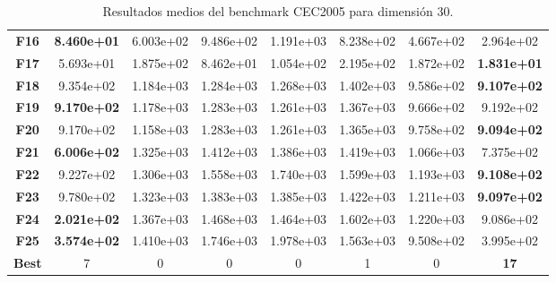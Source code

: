 \begin{table}
{\begin{tabular}{cccccccc}
		\textbf{F16}  &  \textbf{8.460e+01} &  6.003e+02 &  9.486e+02 &  1.191e+03 &  8.238e+02 &  4.667e+02 &  2.964e+02 \\
		\textbf{F17}  &  5.693e+01 &  1.875e+02 &  8.462e+01 &  1.054e+02 &  2.195e+02 &  1.872e+02 &  \textbf{1.831e+01} \\
		\textbf{F18}  &  9.354e+02 &  1.184e+03 &  1.284e+03 &  1.268e+03 &  1.402e+03 &  9.586e+02 &  \textbf{9.107e+02} \\
		\textbf{F19}  &  \textbf{9.170e+02} &  1.178e+03 &  1.283e+03 &  1.261e+03 &  1.367e+03 &  9.666e+02 &  9.192e+02 \\
		\textbf{F20}  &  9.170e+02 &  1.158e+03 &  1.283e+03 &  1.261e+03 &  1.365e+03 &  9.758e+02 &  \textbf{9.094e+02} \\
		\textbf{F21}  &  \textbf{6.006e+02} &  1.325e+03 &  1.412e+03 &  1.386e+03 &  1.419e+03 &  1.066e+03 &  7.375e+02 \\
		\textbf{F22}  &  9.227e+02 &  1.306e+03 &  1.558e+03 &  1.740e+03 &  1.599e+03 &  1.193e+03 &  \textbf{9.108e+02} \\
		\textbf{F23}  &  9.780e+02 &  1.323e+03 &  1.383e+03 &  1.385e+03 &  1.422e+03 &  1.211e+03 &  \textbf{9.097e+02} \\
		\textbf{F24}  &  \textbf{2.021e+02} &  1.367e+03 &  1.468e+03 &  1.464e+03 &  1.602e+03 &  1.220e+03 &  9.086e+02 \\
		\textbf{F25}  &  \textbf{3.574e+02} &  1.410e+03 &  1.746e+03 &  1.978e+03 &  1.563e+03 &  9.508e+02 &  3.995e+02 \\
		\textbf{Best} &          7 &          0 &          0 &          0 &          1 &          0 &         \textbf{17} \\
		\bottomrule
\end{tabular}}
	\caption{Resultados medios del benchmark CEC2005 para dimensión 30.}
\end{table}


